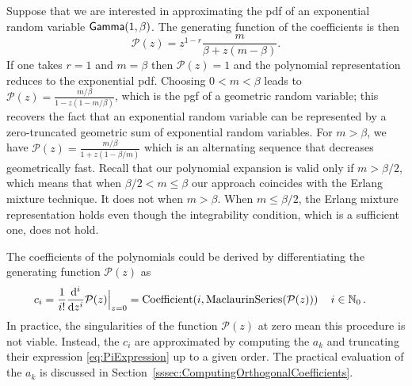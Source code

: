 \begin{example}\label{ex:RecoveryExponentialRV}
Suppose that we are interested in approximating the pdf of an exponential random variable $\mathsf{Gamma}(1,\beta)$. The generating function of the coefficients is then
\begin{equation*}\label{eq:GeneratingFunctionExpRV}
\mathcal{P}(z)=z^{1-r}\frac{m}{\beta+z(m-\beta)}.
\end{equation*}
If one takes $r=1$ and $m=\beta$ then $\mathcal{P}(z)=1$ and the polynomial representation reduces to the exponential pdf. Choosing $0<m<\beta$ leads to $\mathcal{P}(z)=\frac{m/\beta}{1-z(1-m/\beta)}$, which is the pgf of a geometric random variable; this recovers the fact that an exponential random variable can be represented by a zero-truncated geometric sum of exponential random variables. For $m>\beta$, we have $\mathcal{P}(z)=\frac{m/\beta}{1+z(1-\beta/m)}$ which is an alternating sequence that decreases geometrically fast. Recall that our polynomial expansion is valid only if $m>\beta/2$, which means that when $\beta/2<m\leq \beta$ our approach coincides with the Erlang mixture technique. It does not when $m>\beta$. When $m\leq\beta/2$, the Erlang mixture representation holds even though the integrability condition, which is a sufficient one, does not hold.
\end{example}
The coefficients of the polynomials could be derived by differentiating the generating function $\mathcal{P}(z)$ as
\begin{align*}\label{eq:PolynomialExpansionCoefficientDerivativeGeneratingFunction}
c_i&=\frac{1}{i!}\frac{\mathop{}\!\mathrm{d}^{i}}{\mathop{}\!\mathrm{d} z^{i}}\mathcal{P}(z)\Big\rvert_{z=0}  =\text{Coefficient}(i, \text{MaclaurinSeries}(\mathcal{P}(z))) \, \quad i \in \mathbb{N}_0\,.
\end{align*}
In practice, the singularities of the function $\mathcal{P}(z)$ at zero mean this procedure is not viable. Instead, the $c_i$ are approximated by computing the $a_k$ and truncating their expression \eqref{eq:PiExpression} up to a given order. The practical evaluation of the $a_k$ is discussed in Section~\ref{sssec:ComputingOrthogonalCoefficients}.

